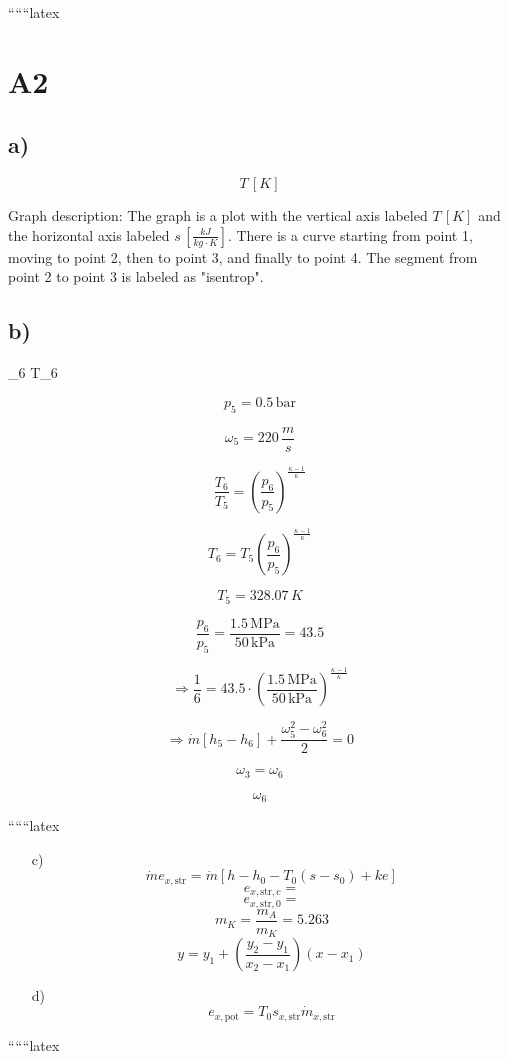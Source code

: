 
``````latex


\section*{A2}

\subsection*{a)}

\[
T \, [K]
\]

Graph description: The graph is a plot with the vertical axis labeled \( T \, [K] \) and the horizontal axis labeled \( s \, \left[ \frac{kJ}{kg \cdot K} \right] \). There is a curve starting from point 1, moving to point 2, then to point 3, and finally to point 4. The segment from point 2 to point 3 is labeled as "isentrop".

\subsection*{b)}

 \quad \omega_6 \quad {} \quad T_6

\[
p_5 = 0.5 \, \text{bar}
\]

\[
\omega_5 = 220 \, \frac{m}{s}
\]

\[
\frac{T_6}{T_5} = \left( \frac{p_6}{p_5} \right)^{\frac{\kappa - 1}{\kappa}}
\]

\[
T_6 = T_5 \left( \frac{p_6}{p_5} \right)^{\frac{\kappa - 1}{\kappa}}
\]

\[
T_5 = 328.07 \, K
\]

\[
\frac{p_6}{p_5} = \frac{1.5 \, \text{MPa}}{50 \, \text{kPa}} = 43.5
\]

\[
\Rightarrow \frac{1}{6} = 43.5 \cdot \left( \frac{1.5 \, \text{MPa}}{50 \, \text{kPa}} \right)^{\frac{\kappa - 1}{\kappa}}
\]

\[
\Rightarrow \dot{m} \left[ h_5 - h_6 \right] + \frac{\omega_5^2 - \omega_6^2}{2} = 0
\]

 \quad {} \quad {}

\[
\omega_3 = \omega_6
\]

\[
\omega_6
\]

``````latex


\begin{itemize}
    \item[c)] 
    \[
    \dot{m} e_{x, \text{str}} = \dot{m} \left[ h - h_0 - T_0 (s - s_0) + ke \right]
    \]
    \[
    e_{x, \text{str}, c} = 
    \]
    \[
    e_{x, \text{str}, 0} = 
    \]
    \[
    m_K = \frac{m_A}{m_K} = 5.263
    \]
    \[
    y = y_1 + \left( \frac{y_2 - y_1}{x_2 - x_1} \right) (x - x_1)
    \]
    
    \item[d)] 
    \[
    e_{x, \text{pot}} = T_0 s_{x, \text{str}} \dot{m}_{x, \text{str}}
    \]
\end{itemize}

``````latex


